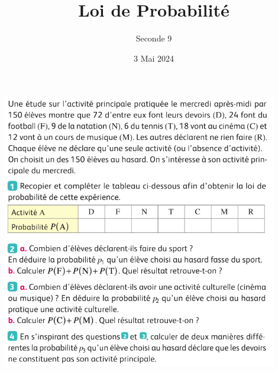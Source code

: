 \documentclass{article}
\title{Loi de Probabilité}
\date{3 Mai 2024}
\author{Seconde 9}
\begin{document}
\maketitle
\pagestyle{empty}

\includegraphics[width=0.9\textwidth]{Activite2page336.png}
\end{document}
